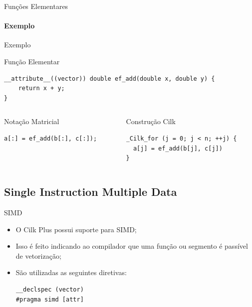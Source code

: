 \documentclass{beamer}
\begin{document}
\begin{frame}[fragile]{Funções Elementares}
\framesubtitle{Exemplo}
\begin{scriptsize}
\begin{block}{Exemplo}
\begin{block}{Função Elementar}
\begin{lstlisting}
__attribute__((vector)) double ef_add(double x, double y) {
    return x + y;
}
\end{lstlisting}
\end{block}
\begin{columns}
\begin{column}{0.4\textwidth}
\begin{block}{Notação Matricial}
\begin{lstlisting}
a[:] = ef_add(b[:], c[:]);
\end{lstlisting}
\end{block}

\end{column}
\begin{column}{0.4\textwidth}
\begin{block}{Construção Cilk}
\begin{lstlisting}
_Cilk_for (j = 0; j < n; ++j) {
  a[j] = ef_add(b[j], c[j])
}
\end{lstlisting}
\end{block}
\end{column}
\end{columns}

\end{block}
\end{scriptsize}
\end{frame}

\subsection{Single Instruction Multiple Data}

\begin{frame}[fragile]{SIMD}
\begin{itemize}
     \item O Cilk Plus possui suporte para SIMD;
     \item Isso é feito indicando ao compilador que uma função ou segmento é
     passível de vetorização;
     \item São utilizadas as seguintes diretivas:

\begin{lstlisting}[deletekeywords={vector}]
__declspec (vector)
#pragma simd [attr]
\end{lstlisting}
\end{itemize}
\end{frame}
\end{document}
